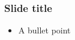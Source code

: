 
\begin{frame}[t,plain]
\titlepage
\end{frame}

\begin{frame}
    \frametitle{Slide title}
    \begin{itemize}
        \item A bullet point
    \end{itemize}

\end{frame}
